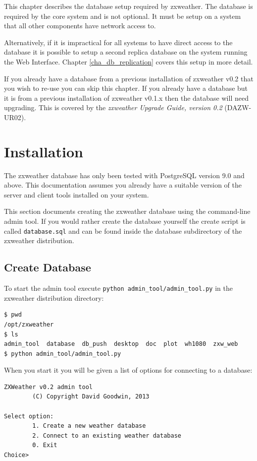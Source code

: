 \documentclass[a4paper,10pt,draft]{book}
\begin{document}
This chapter describes the database setup required by zxweather. The database is required by the core system and is not optional. It must be setup on a system that all other components have network access to.


Alternatively, if it is impractical for all systems to have direct access to the database it is possible to setup a second replica database on the system running the Web Interface. Chapter \ref{cha_db_replication} covers this setup in more detail.

If you already have a database from a previous installation of zxweather v0.2 that you wish to re-use you can skip this chapter. If you already have a database but it is from a previous installation of zxweather v0.1.x then the database will need upgrading. This is covered by the \emph{zxweather Upgrade Guide, version 0.2} (DAZW-UR02).

\section{Installation}
The zxweather database has only been tested with PostgreSQL version 9.0 and above. This documentation assumes you already have a suitable version of the server and client tools installed on your system.

This section documents creating the zxweather database using the command-line admin tool. If you would rather create the database yourself the create script is called \verb|database.sql| and can be found inside the database subdirectory of the zxweather distribution. 


\subsection{Create Database}
To start the admin tool execute \verb|python admin_tool/admin_tool.py| in the zxweather distribution directory:

\begin{verbatim}
$ pwd
/opt/zxweather
$ ls
admin_tool  database  db_push  desktop  doc  plot  wh1080  zxw_web
$ python admin_tool/admin_tool.py
\end{verbatim}

When you start it you will be given a list of options for connecting to a database:
\begin{verbatim}
ZXWeather v0.2 admin tool
        (C) Copyright David Goodwin, 2013

Select option:
        1. Create a new weather database
        2. Connect to an existing weather database
        0. Exit
Choice>
\end{verbatim}
\end{document}
